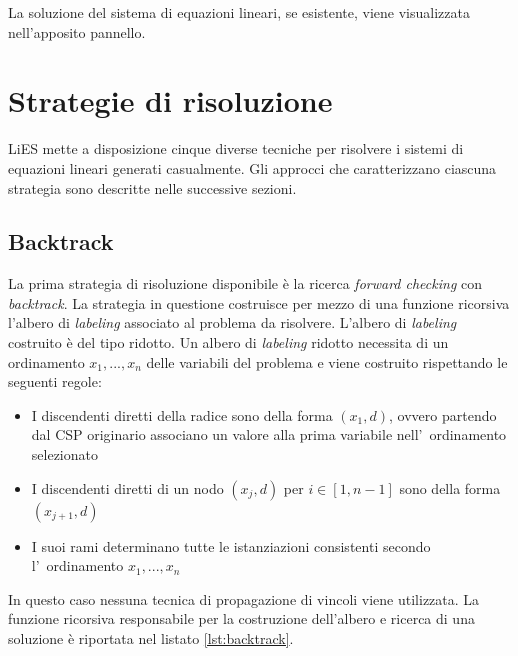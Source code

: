 \documentclass[10pt, a4paper]{article}
\begin{document}
La soluzione del sistema di equazioni lineari, se esistente, viene visualizzata nell'apposito pannello.


\section{Strategie di risoluzione}
\label{sec:strategie}

LiES mette a disposizione cinque diverse tecniche per risolvere i sistemi di equazioni lineari generati casualmente. Gli approcci che caratterizzano ciascuna strategia sono descritte nelle successive sezioni.

\subsection{Backtrack}
\label{sec:backtrack}

La prima strategia di risoluzione disponibile è la ricerca \textit{forward checking} con \textit{backtrack}. La strategia in questione costruisce per mezzo di una funzione ricorsiva l'albero di \textit{labeling} associato al problema da risolvere. L'albero di \textit{labeling} costruito è del tipo ridotto. Un albero di \textit{labeling} ridotto necessita di un ordinamento $x_1, ..., x_n$ delle variabili del problema e viene costruito rispettando le seguenti regole:

\begin{itemize}
	\item I discendenti diretti della radice sono della forma $(x_1, d)$, ovvero partendo dal CSP originario associano un valore alla prima variabile nell'~ordinamento selezionato
	\item I discendenti diretti di un nodo $(x_j, d)$ per $i \in \left [ 1, n-1 \right ]$ sono della forma $(x_{j+1}, d)$
	\item I suoi rami determinano tutte le istanziazioni consistenti secondo l'~ordinamento $x_1, ..., x_n$ 
\end{itemize}

In questo caso nessuna tecnica di propagazione di vincoli viene utilizzata. La funzione ricorsiva responsabile per la costruzione dell'albero e ricerca di una soluzione è riportata nel listato \ref{lst:backtrack}.
\end{document}
